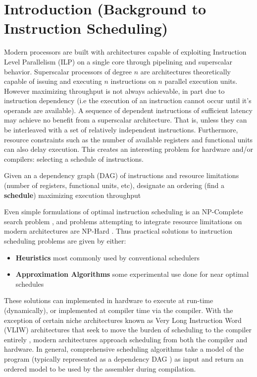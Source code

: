 \documentclass[12pt]{report}
\begin{document}
\chapter{Introduction (Background to Instruction Scheduling)}
\label{sec:orgd28c51a}
Modern processors are built with architectures capable of exploiting
Instruction Level Parallelism (ILP) on a single core 
through pipelining and superscalar behavior. Superscalar
processors of degree \(n\) are architectures theoretically capable of issuing
and executing \(n\) instructions on \(n\) parallel execution units. However
maximizing throughput is not always achievable, in part due to instruction
dependency (i.e the execution of an instruction cannot occur until it's
operands are available). A sequence of dependent instructions of sufficient
latency may achieve no benefit from a superscalar architecture. That is, unless they can be
interleaved with a set of relatively independent instructions. Furthermore,
resource constraints such as the number of available registers and functional
units can also delay execution. This creates an interesting problem for
hardware and/or compilers: selecting a schedule of instructions.
\begin{tcolorbox}[title=Problem: Instruction Scheduling]
Given an a dependency graph (DAG) of instructions and resource limitations
(number of registers, functional units, etc), designate an ordering (find a \textbf{schedule}) 
maximizing execution throughput 
\end{tcolorbox}

Even simple formulations of optimal instruction scheduling is an NP-Complete
search problem \parencite{hennessy1983postpass}, and problems attempting to
integrate resource limitations on modern architectures are NP-Hard
\parencite{motwani1995combining}. Thus practical solutions to instruction
scheduling problems are given by either:
\begin{itemize}
\item \textbf{Heuristics} most commonly used by conventional schedulers
\item \textbf{Approximation Algorithms} some experimental use done for near optimal
schedules \parencite{costa2016approx}
\end{itemize}
These solutions can implemented in hardware to execute at run-time
 (dynamically), or implemented at compiler time via the compiler. With the
 exception of certain niche architectures known as Very Long Instruction Word
 (VLIW) architectures that seek to move the burden of scheduling to the compiler
 entirely \parencite{fisher1983very}, modern architectures approach scheduling
 from both the compiler and hardware. In general, comprehensive scheduling
 algorithms take a model of the program (typically represented as a dependency
 DAG \parencite{gibbons1986efficient}) as input and return an ordered model to
 be used by the assembler during compilation.
\end{document}
